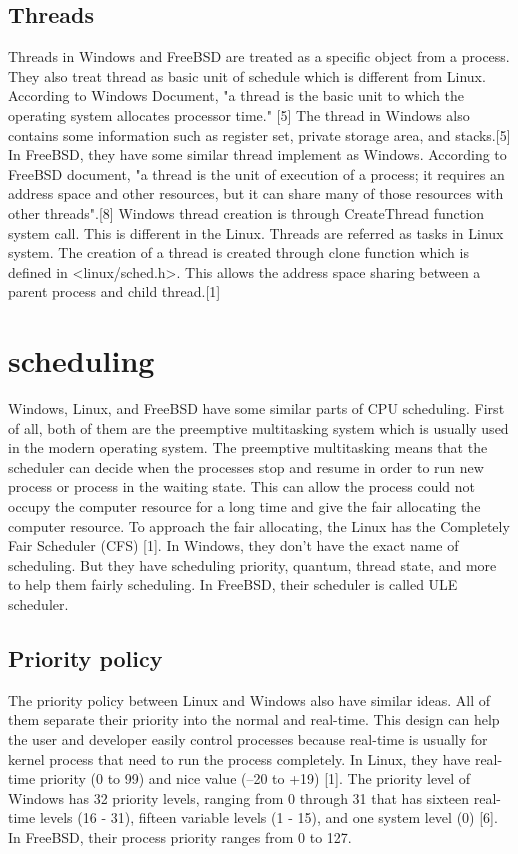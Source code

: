 \documentclass[letterpaper,draftclsnofoot,journal,compsoc,10pt,onecolumn]{IEEEtran}
\begin{document}
\subsection{Threads}
\indent Threads in Windows and FreeBSD are treated as a specific object from a process. They also treat thread as basic unit of schedule which is different from Linux. According to Windows Document, "a thread is the basic unit to which the operating system allocates processor time." [5] The thread in Windows also contains some information such as register set, private storage area, and stacks.[5] In FreeBSD, they have some similar thread implement as Windows. According to FreeBSD document, "a thread is the unit of execution of a process; it requires an address space and other resources, but it can share many of those resources with other threads".[8]  Windows thread creation is through CreateThread function system call. This is different in the Linux. Threads are referred as tasks in Linux system. The creation of a thread is created through clone function which is defined in <linux/sched.h>. This allows the address space sharing between a parent process and child thread.[1]

\section{scheduling} 
\indent Windows, Linux, and FreeBSD have some similar parts of CPU scheduling. First of all, both of them are the preemptive multitasking system which is usually used in the modern operating system. The preemptive multitasking means that the scheduler can decide when the processes stop and resume in order to run new process or process in the waiting state. This can allow the process could not occupy the computer resource for a long time and give the fair allocating the computer resource. To approach the fair allocating, the Linux has the Completely Fair Scheduler (CFS) [1]. In Windows, they don’t have the exact name of scheduling. But they have scheduling priority, quantum, thread state, and more to help them fairly scheduling. In FreeBSD, their scheduler is called ULE scheduler.\\
\subsection{Priority policy}
\indent The priority policy between Linux and Windows also have similar ideas.  All of them separate their priority into the normal and real-time. This design can help the user and developer easily control processes because real-time is usually for kernel process that need to run the process completely. In Linux, they have real-time priority (0 to 99) and nice value (–20 to +19) [1]. The priority level of Windows has 32 priority levels, ranging from 0 through 31 that has sixteen real-time levels (16 - 31), fifteen variable levels (1 - 15), and one system level (0) [6]. In FreeBSD, their process priority ranges from 0 to 127. 
\end{document}
